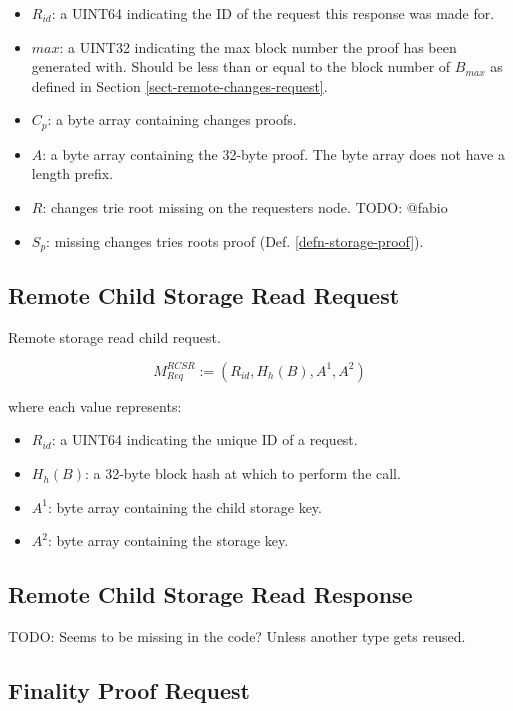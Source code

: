 \documentclass{book}
\newcommand{\todo}[1]{}
\renewcommand{\todo}[1]{{\color{red} TODO: {#1}}}
\begin{document}
\begin{itemize}
    \item $R_{id}$: a UINT64 indicating the ID of the request this response was
    made for.
    \item $max$: a UINT32 indicating the max block number the proof has been
    generated with. Should be less than or equal to the block number of
    $B_{max}$ as defined in Section \ref{sect-remote-changes-request}.
    \item $C_p$: a byte array containing changes proofs.
    \item $A$: a byte array containing the 32-byte proof. The byte array does
    not have a length prefix.
    \item $R$: changes trie root missing on the requesters node. \todo{@fabio}
    \item $S_p$: missing changes tries roots proof (Def.
    \ref{defn-storage-proof}).
\end{itemize}

\subsection{Remote Child Storage Read Request}

Remote storage read child request.

\[
    M^{RCSR}_{Req} := (R_{id}, H_h(B), A^1, A^2)
\]

where each value represents:

\begin{itemize}
    \item $R_{id}$: a UINT64 indicating the unique ID of a request.
    \item $H_h(B)$: a 32-byte block hash at which to perform the call.
    \item $A^1$: byte array containing the child storage key.
    \item $A^2$: byte array containing the storage key.
\end{itemize}

\subsection{Remote Child Storage Read Response}

\todo{Seems to be missing in the code? Unless another type gets reused.}

\subsection{Finality Proof Request}\label{sect-finality-proof-request}
\end{document}
